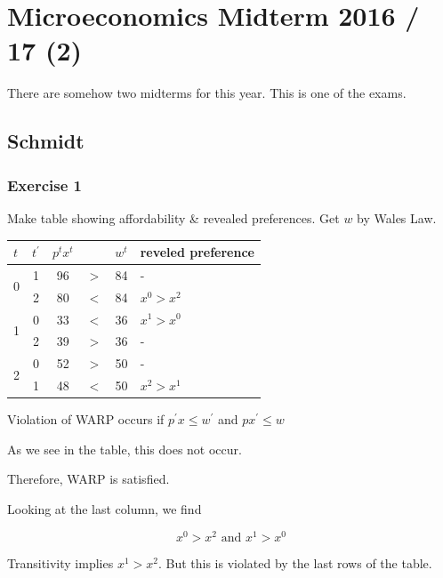 \section{Microeconomics Midterm 2016 / 17 (2)}

There are somehow two midterms for this year. This is one of the exams.

{
\subsection*{Schmidt}

\subsubsection*{Exercise 1}

Make table showing affordability \& revealed preferences. Get $w$ by Wales Law.

\begin{table}[!htp]
    \centering
    \begin{tabular}{l|c|c|c|c|l}
        $t$ & $t^{\prime}$ & $p^{t} x^{t}$ &  & $w^{t}$ & reveled preference \\
        \hline \multirow{2}{*}{0} & 1 & 96 & $>$ & 84 & - \\
        \cline { 2 - 6 } & 2 & 80 & $<$ & 84 & $x^{0}>x^{2}$ \\
        \hline \multirow{2}{*}{1} & 0 & 33 & $<$ & 36 & $x^{1}>x^{0}$ \\
        \cline { 2 - 6 } & 2 & 39 & $>$ & 36 & - \\
        \hline \multirow{2}{*}{2} & 0 & 52 & $>$ & 50 & - \\
        \cline { 2 - 6 } & 1 & 48 & $<$ & 50 & $x^{2}>x^{1}$ \\
        \hline
    \end{tabular}
\end{table}

\begin{enumerate}[label=(\alph*)]
{\item 
Violation of WARP occurs if $p^{\prime} x \leqslant w^{\prime}$ and $p x^{\prime} \leqslant w$

As we see in the table, this does not occur.

Therefore, WARP is satisfied.
}
{\item 
Looking at the last column, we find

$$
x^{0}>x^{2} \text { and } x^{1}>x^{0}
$$

Transitivity implies $x^{1}>x^{2}$. But this is violated by the last rows of the table.
}
\end{enumerate}
}
